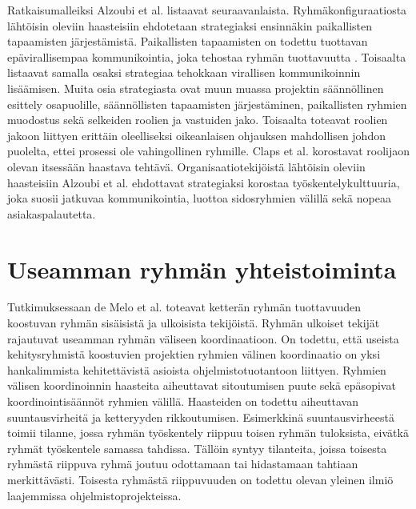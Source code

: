 Ratkaisumalleiksi Alzoubi et al. \cite{ALZOUBI201622} listaavat seuraavanlaista. Ryhmäkonfiguraatiosta lähtöisin oleviin haasteisiin ehdotetaan strategiaksi ensinnäkin paikallisten tapaamisten järjestämistä. Paikallisten tapaamisten on todettu tuottavan epävirallisempaa kommunikointia, joka tehostaa ryhmän tuottavuutta \cite{DEOMELO2013412}. Toisaalta \cite{ALZOUBI201622} listaavat samalla osaksi strategiaa tehokkaan virallisen kommunikoinnin lisäämisen. Muita osia strategiasta ovat muun muassa projektin säännöllinen esittely osapuolille, säännöllisten tapaamisten järjestäminen, paikallisten ryhmien muodostus sekä selkeiden roolien ja vastuiden jako. Toisaalta \cite{CLAPS201521} toteavat roolien jakoon liittyen erittäin oleelliseksi oikeanlaisen ohjauksen mahdollisen johdon puolelta, ettei prosessi ole vahingollinen ryhmille. Claps et al. \cite{CLAPS201521} korostavat roolijaon olevan itsessään haastava tehtävä. Organisaatiotekijöistä lähtöisin oleviin haasteisiin Alzoubi et al. \cite{ALZOUBI201622} ehdottavat strategiaksi korostaa työskentelykulttuuria, joka suosii jatkuvaa kommunikointia, luottoa sidosryhmien välillä sekä nopeaa asiakaspalautetta. 

\section{Useamman ryhmän yhteistoiminta}

Tutkimuksessaan de Melo et al. \cite{DEOMELO2013412} toteavat ketterän ryhmän tuottavuuden koostuvan ryhmän sisäisistä ja ulkoisista tekijöistä. Ryhmän ulkoiset tekijät rajautuvat useamman ryhmän väliseen koordinaatioon. On todettu, että useista kehitysryhmistä koostuvien projektien ryhmien välinen koordinaatio on yksi hankalimmista kehitettävistä asioista ohjelmistotuotantoon liittyen. Ryhmien välisen koordinoinnin haasteita aiheuttavat sitoutumisen puute sekä epäsopivat koordinointisäännöt ryhmien välillä. Haasteiden on todettu aiheuttavan suuntausvirheitä ja ketteryyden rikkoutumisen. Esimerkkinä suuntausvirheestä toimii tilanne, jossa ryhmän työskentely riippuu toisen ryhmän tuloksista, eivätkä ryhmät työskentele samassa tahdissa. Tällöin syntyy tilanteita, joissa toisesta ryhmästä riippuva ryhmä joutuu odottamaan tai hidastamaan tahtiaan merkittävästi. Toisesta ryhmästä riippuvuuden on todettu olevan yleinen ilmiö laajemmissa ohjelmistoprojekteissa.

